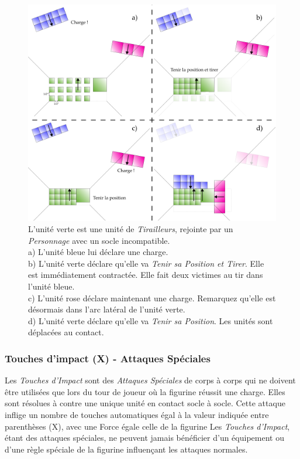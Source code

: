 \begin{figure}[!htbp]
\centering
\includegraphics[width=15.5cm]{tirailleurs.png}
\caption{L'unité verte est une unité de \emph{Tirailleurs}, rejointe par un \emph{Personnage} avec un socle incompatible. \\
a) L'unité bleue lui déclare une charge. \\
b) L'unité verte déclare qu'elle va \emph{Tenir sa Position et Tirer}. Elle est immédiatement contractée. Elle fait deux victimes au tir dans l'unité bleue. \\
c) L'unité rose déclare maintenant une charge. Remarquez qu'elle est désormais dans l'arc latéral de l'unité verte. \\
d) L'unité verte déclare qu'elle va \emph{Tenir sa Position}. Les unités sont déplacées au contact.}
\label{figure/tirailleurs}
\end{figure}

\subsubsection*{Touches d'impact (X) - Attaques Spéciales}

Les \emph{Touches d'Impact} sont des \emph{Attaques Spéciales} de corps à corps qui ne doivent être utilisées que lors du tour de joueur où la figurine réussit une charge. Elles sont résolues à  contre une unique unité en contact socle à socle. Cette attaque inflige un nombre de touches automatiques égal à la valeur indiquée entre parenthèses (X), avec une Force égale celle de la figurine  Les \emph{Touches d'Impact}, étant des attaques spéciales, ne peuvent jamais bénéficier d'un équipement ou d'une règle spéciale de la figurine influençant les attaques normales. 

